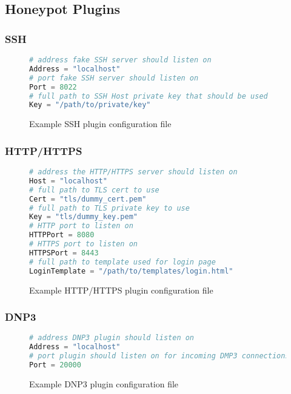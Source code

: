 \subsection{Honeypot Plugins}

\subsubsection{SSH}

\begin{figure}[H]
\begin{lstlisting}[language=Python,frame=single]
# address fake SSH server should listen on
Address = "localhost"
# port fake SSH server should listen on
Port = 8022
# full path to SSH Host private key that should be used
Key = "/path/to/private/key"
\end{lstlisting}
\caption{Example SSH plugin configuration file}
\end{figure}

\subsubsection{HTTP/HTTPS}

\begin{figure}[H]
\begin{lstlisting}[language=Python,frame=single]
# address the HTTP/HTTPS server should listen on
Host = "localhost"
# full path to TLS cert to use
Cert = "tls/dummy_cert.pem"
# full path to TLS private key to use
Key = "tls/dummy_key.pem"
# HTTP port to listen on
HTTPPort = 8080
# HTTPS port to listen on
HTTPSPort = 8443
# full path to template used for login page
LoginTemplate = "/path/to/templates/login.html"
\end{lstlisting}
\caption{Example HTTP/HTTPS plugin configuration file}
\end{figure}

\subsubsection{DNP3}

\begin{figure}[H]
\begin{lstlisting}[language=Python,frame=single]
# address DNP3 plugin should listen on
Address = "localhost"
# port plugin should listen on for incoming DMP3 connections
Port = 20000
\end{lstlisting}
\caption{Example DNP3 plugin configuration file}
\end{figure}

